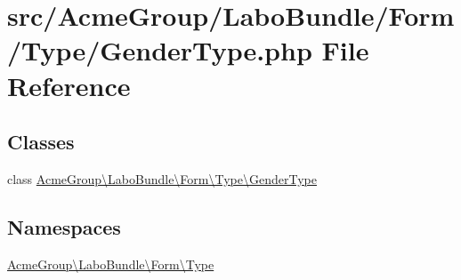 \hypertarget{_gender_type_8php}{\section{src/\+Acme\+Group/\+Labo\+Bundle/\+Form/\+Type/\+Gender\+Type.php File Reference}
\label{_gender_type_8php}
}
\subsection*{Classes}
\begin{DoxyCompactItemize}
\item 
class \hyperlink{class_acme_group_1_1_labo_bundle_1_1_form_1_1_type_1_1_gender_type}{Acme\+Group\textbackslash{}\+Labo\+Bundle\textbackslash{}\+Form\textbackslash{}\+Type\textbackslash{}\+Gender\+Type}
\end{DoxyCompactItemize}
\subsection*{Namespaces}
\begin{DoxyCompactItemize}
\item 
 \hyperlink{namespace_acme_group_1_1_labo_bundle_1_1_form_1_1_type}{Acme\+Group\textbackslash{}\+Labo\+Bundle\textbackslash{}\+Form\textbackslash{}\+Type}
\end{DoxyCompactItemize}
